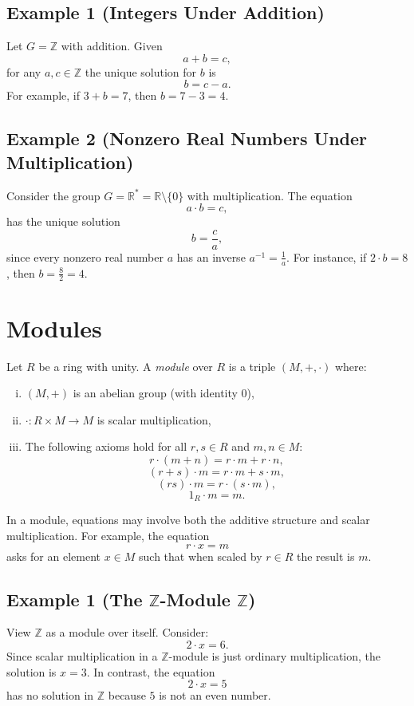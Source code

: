 \documentclass[11pt,openany]{article}
\begin{document}
\subsection*{Example 1 (Integers Under Addition)}
Let \(G=\mathbb{Z}\) with addition. Given
\[
a+b = c,
\]
for any \(a,c\in \mathbb{Z}\) the unique solution for \(b\) is
\[
b=c-a.
\]
For example, if \(3+b=7\), then \(b=7-3=4\).

\subsection*{Example 2 (Nonzero Real Numbers Under Multiplication)}
Consider the group \(G=\mathbb{R}^*=\mathbb{R}\setminus\{0\}\) with multiplication. The equation
\[
a\cdot b = c,
\]
has the unique solution
\[
b = \frac{c}{a},
\]
since every nonzero real number \(a\) has an inverse \(a^{-1}=\frac{1}{a}\). For instance, if \(2\cdot b=8\), then \(b=\frac{8}{2}=4\).

\section{Modules}
\begin{definition}[Module]
	Let \(R\) be a ring with unity. A \emph{module} over \(R\) is a triple \((M, +, \cdot)\) where:
	\begin{enumerate}[(i)]
		\item \((M,+)\) is an abelian group (with identity \(0\)),
		\item \(\cdot : R \times M \to M\) is scalar multiplication,
		\item The following axioms hold for all \(r,s \in R\) and \(m,n \in M\):
		\[
		r\cdot(m+n)=r\cdot m + r\cdot n,
		\]
		\[
		(r+s)\cdot m = r\cdot m + s\cdot m,
		\]
		\[
		(rs)\cdot m = r\cdot(s\cdot m),
		\]
		\[
		1_R\cdot m = m.
		\]
	\end{enumerate}
\end{definition}

In a module, equations may involve both the additive structure and scalar multiplication. For example, the equation
\[
r\cdot x = m
\]
asks for an element \(x\in M\) such that when scaled by \(r\in R\) the result is \(m\).

\subsection*{Example 1 (The \(\mathbb{Z}\)-Module \(\mathbb{Z}\))}
View \(\mathbb{Z}\) as a module over itself. Consider:
\[
2\cdot x = 6.
\]
Since scalar multiplication in a \(\mathbb{Z}\)-module is just ordinary multiplication, the solution is \(x=3\). In contrast, the equation
\[
2\cdot x = 5
\]
has no solution in \(\mathbb{Z}\) because \(5\) is not an even number.
\end{document}
